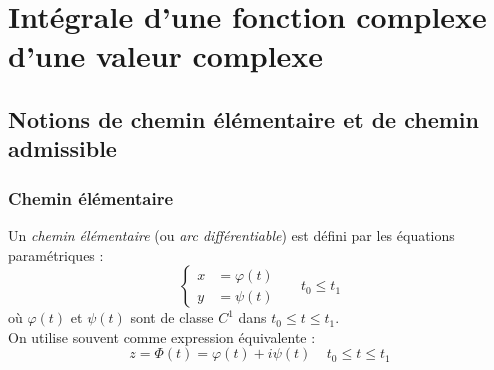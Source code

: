 \section{Intégrale d'une fonction complexe d'une valeur complexe}
    \subsection{Notions de chemin élémentaire et de chemin admissible}
        \subsubsection{Chemin élémentaire}
    Un \textit{chemin élémentaire} (ou \textit{arc différentiable}) est défini par les équations
    paramétriques :
    \begin{equation}
    \left\{\begin{array}{ll}
    x &= \varphi(t)  \\
    y &= \psi(t) 
    \end{array}\right.\ \ \ \ \ \ \ t_0\leq t_1
    \end{equation}
    où $\varphi(t)$ et $\psi(t)$ sont de classe $C^1$ dans $t_0 \leq t\leq t_1$.\\
    On utilise souvent comme expression équivalente : 
    \begin{equation}
    z = \Phi(t) = \varphi(t) + i\psi(t)\ \ \ \ \ t_0 \leq t\leq t_1
    \end{equation}
    
    
